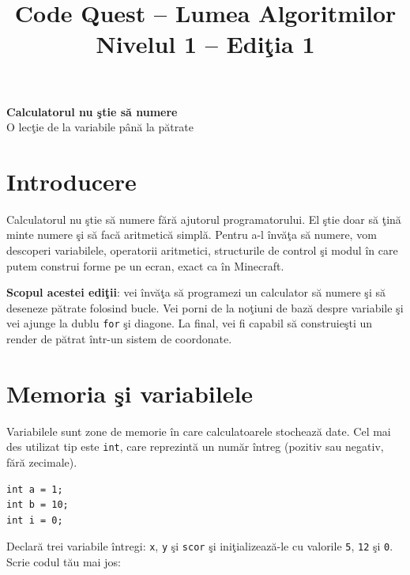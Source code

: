 \documentclass[11pt,a4paper]{article}
\title{Code Quest -- Lumea Algoritmilor\\Nivelul 1 -- Edi\c{t}ia 1}
\author{}
\date{}
\begin{document}
\maketitle

\begin{center}
  {\Large \textbf{Calculatorul nu \c{s}tie s\u{a} numere}}\\[0.5em]
  {\small O lec\c{t}ie de la variabile p\^an\u{a} la p\u{a}trate}
\end{center}

\section*{Introducere}
Calculatorul nu \c{s}tie s\u{a} numere f\u{a}r\u{a} ajutorul programatorului. El \c{s}tie doar s\u{a} \c{t}in\u{a} minte numere \c{s}i s\u{a} fac\u{a} aritmetic\u{a} simpl\u{a}. Pentru a-l \^{i}nv\u{a}\c{t}a s\u{a} numere, vom descoperi variabilele, operatorii aritmetici, structurile de control \c{s}i modul \^{i}n care putem construi forme pe un ecran, exact ca \^{i}n Minecraft.

\begin{missionbox}[Misiunea ta]
\textbf{Scopul acestei edi\c{t}ii}: vei \^{i}nv\u{a}\c{t}a s\u{a} programezi un calculator s\u{a} numere \c{s}i s\u{a} deseneze p\u{a}trate folosind bucle. Vei porni de la no\c{t}iuni de baz\u{a} despre variabile \c{s}i vei ajunge la dublu \texttt{for} \c{s}i diagone. La final, vei fi capabil s\u{a} construie\c{s}ti un render de p\u{a}trat \^{i}ntr-un sistem de coordonate.
\end{missionbox}

\section*{Memoria \c{s}i variabilele}
Variabilele sunt zone de memorie \^{i}n care calculatoarele stocheaz\u{a} date. Cel mai des utilizat tip este \texttt{int}, care reprezint\u{a} un num\u{a}r \^{i}ntreg (pozitiv sau negativ, f\u{a}r\u{a} zecimale).

\begin{examplebox}
\begin{lstlisting}[style=cpp]
int a = 1;
int b = 10;
int i = 0;
\end{lstlisting}
\end{examplebox}

\begin{tryit}
Declar\u{a} trei variabile \^{i}ntregi: \texttt{x}, \texttt{y} \c{s}i \texttt{scor} \c{s}i ini\c{t}ializeaz\u{a}-le cu valorile \texttt{5}, \texttt{12} \c{s}i \texttt{0}. Scrie codul t\u{a}u mai jos:
\end{tryit}
\end{document}
